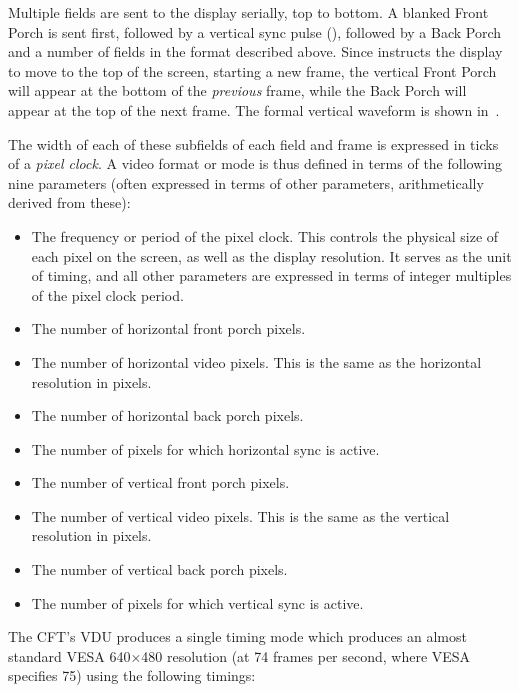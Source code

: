 Multiple fields are sent to the display serially, top to bottom. A blanked Front
Porch is sent first, followed by a vertical sync pulse (), followed
by a Back Porch and a number of fields in the format described above. Since
 instructs the display to move to the top of the screen, starting a
new frame, the vertical Front Porch will appear at the bottom of the {\em
  previous\/} frame, while the Back Porch will appear at the top of the next
frame. The formal vertical waveform is shown in~.

The width of each of these subfields of each field and frame is expressed in
ticks of a {\em pixel clock\/}. A video format or mode is thus defined in terms
of the following nine parameters (often expressed in terms of other parameters,
arithmetically derived from these):

\begin{itemize}
\item The frequency or period of the pixel clock. This controls the physical size of each pixel on the screen, as well as the display resolution. It serves as the unit of timing, and all other parameters are expressed in terms of integer multiples of the pixel clock period.
\item The number of horizontal front porch pixels.
\item The number of horizontal video pixels. This is the same as the horizontal resolution in pixels.
\item The number of horizontal back porch pixels.
\item The number of pixels for which horizontal sync is active.
\item The number of vertical front porch pixels.
\item The number of vertical video pixels. This is the same as the vertical resolution in pixels.
\item The number of vertical back porch pixels.
\item The number of pixels for which vertical sync is active.
\end{itemize}

The CFT's VDU produces a single timing mode which produces an almost standard
VESA 640×480 resolution (at 74 frames per second, where VESA specifies 75)
using the following timings:

